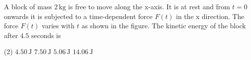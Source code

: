 
\item A block of mass \(2 \, \text{kg}\) is free to move along the x-axis. It is at rest and from \( t = 0 \) onwards it is subjected to a time-dependent force \( F(t) \) in the x direction. The force \( F(t) \) varies with \( t \) as shown in the figure. The kinetic energy of the block after \( 4.5 \) seconds is
    \begin{center}
    \end{center}
    \begin{tasks}(2)
        \task \(4.50 \, \text{J}\)
        \task \(7.50 \, \text{J}\)
        \task \(5.06 \, \text{J}\)\ans
        \task \(14.06 \, \text{J}\)
    \end{tasks}
